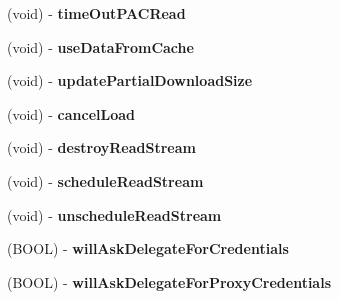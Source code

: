 \begin{DoxyCompactItemize}
\item 
\hypertarget{interface_a_s_i_h_t_t_p_request_07_08_a831dd38482b5178ecb6b5a3a73d2d6b4}{
(void) -\/ {\bfseries time\-Out\-P\-A\-C\-Read}}
\label{interface_a_s_i_h_t_t_p_request_07_08_a831dd38482b5178ecb6b5a3a73d2d6b4}

\item 
\hypertarget{interface_a_s_i_h_t_t_p_request_07_08_a7cd96b5cbd524b2110451f6ff7b36f85}{
(void) -\/ {\bfseries use\-Data\-From\-Cache}}
\label{interface_a_s_i_h_t_t_p_request_07_08_a7cd96b5cbd524b2110451f6ff7b36f85}

\item 
\hypertarget{interface_a_s_i_h_t_t_p_request_07_08_aa1a2623d26fc118ae099a6325444a2f4}{
(void) -\/ {\bfseries update\-Partial\-Download\-Size}}
\label{interface_a_s_i_h_t_t_p_request_07_08_aa1a2623d26fc118ae099a6325444a2f4}

\item 
\hypertarget{interface_a_s_i_h_t_t_p_request_07_08_ad64a88ff354a1e9acd0e50f6bd6383af}{
(void) -\/ {\bfseries cancel\-Load}}
\label{interface_a_s_i_h_t_t_p_request_07_08_ad64a88ff354a1e9acd0e50f6bd6383af}

\item 
\hypertarget{interface_a_s_i_h_t_t_p_request_07_08_ab3dbbd41ced7e54f058267aaa2e80150}{
(void) -\/ {\bfseries destroy\-Read\-Stream}}
\label{interface_a_s_i_h_t_t_p_request_07_08_ab3dbbd41ced7e54f058267aaa2e80150}

\item 
\hypertarget{interface_a_s_i_h_t_t_p_request_07_08_a9298c802e2cd503d0f3ae6f508f59e52}{
(void) -\/ {\bfseries schedule\-Read\-Stream}}
\label{interface_a_s_i_h_t_t_p_request_07_08_a9298c802e2cd503d0f3ae6f508f59e52}

\item 
\hypertarget{interface_a_s_i_h_t_t_p_request_07_08_a036ae593e23c948377acca2d405ab265}{
(void) -\/ {\bfseries unschedule\-Read\-Stream}}
\label{interface_a_s_i_h_t_t_p_request_07_08_a036ae593e23c948377acca2d405ab265}

\item 
\hypertarget{interface_a_s_i_h_t_t_p_request_07_08_a2fb19d10e5d6449c7845042add6dc2a1}{
(\-B\-O\-O\-L) -\/ {\bfseries will\-Ask\-Delegate\-For\-Credentials}}
\label{interface_a_s_i_h_t_t_p_request_07_08_a2fb19d10e5d6449c7845042add6dc2a1}

\item 
\hypertarget{interface_a_s_i_h_t_t_p_request_07_08_a52ecd8ea9d13c585c86a7f9031f1d2e8}{
(\-B\-O\-O\-L) -\/ {\bfseries will\-Ask\-Delegate\-For\-Proxy\-Credentials}}
\label{interface_a_s_i_h_t_t_p_request_07_08_a52ecd8ea9d13c585c86a7f9031f1d2e8}


\end{DoxyCompactItemize}
